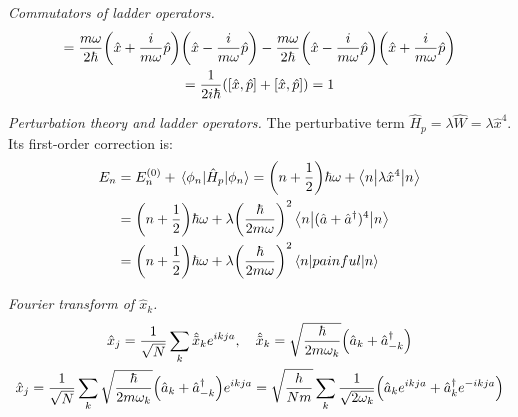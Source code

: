 \documentclass{report}
\begin{document}
\begin{subquests}
	\item \emph{Commutators of ladder operators.}
	\begin{gather*}
		[\hat{a}, \hat{a}^{\dagger}] = \frac{m\omega}{2\hbar}\pqty{\hat{x} + \frac{i}{m\omega}\hat{p}}\pqty{\hat{x} - \frac{i}{m\omega}\hat{p}} - \frac{m\omega}{2\hbar}\pqty{\hat{x} - \frac{i}{m\omega}\hat{p}}\pqty{\hat{x} + \frac{i}{m\omega}\hat{p}} \\ 
		= \frac{1}{2i\hbar}\pqty{[\hat{x},\hat{p}] + [\hat{x},\hat{p}]} = 1
	\end{gather*}

	\item \emph{Perturbation theory and ladder operators.} The perturbative term $\hat H_p = \lambda \hat W = \lambda \hat{x}^4$. Its first-order correction is:
	\begin{align*}
		E_n & = E_n^{(0)} + \mel{\phi_n}{\hat H_p}{\phi_n} = \pqty{n + \frac{1}{2}}\hbar \omega + \mel**{n}{\lambda \hat{x}^4}{n} \\
		& = \pqty{n + \frac{1}{2}}\hbar \omega + \lambda\pqty{\frac{\hbar}{2m\omega}}^2\mel**{n}{(\hat{a} + \hat{a}^{\dagger})^4}{n} \\
		& = \pqty{n + \frac{1}{2}}\hbar \omega + \lambda\pqty{\frac{\hbar}{2m\omega}}^2\mel**{n}{painful}{n}
	\end{align*}

	\item \emph{Fourier transform of $\hat{x}_k$.} 
	\begin{gather*}
		\hat{x}_j = \frac{1}{\sqrt{N}}\sum_{k}\hat{\tilde{x}}_k e^{ikja}, \quad \hat{\tilde x}_k = \sqrt{\frac{\hbar}{2m\omega_k}}\pqty{\hat{a}_k + \hat{a}_{-k}^{\dagger}} \\
		\hat{x}_j = \frac{1}{\sqrt{N}}\sum_{k} \sqrt{\frac{\hbar}{2m\omega_k}}\pqty{\hat{a}_k + \hat{a}_{-k}^{\dagger}}e^{ikja} = \sqrt{\frac{h}{Nm}}\sum_{k}\frac{1}{\sqrt{2\omega_k}}\pqty{\hat{a}_k e^{ikja}+ \hat{a}_{k}^{\dagger}e^{-ikja}}
	\end{gather*}


\end{subquests}
\end{document}
